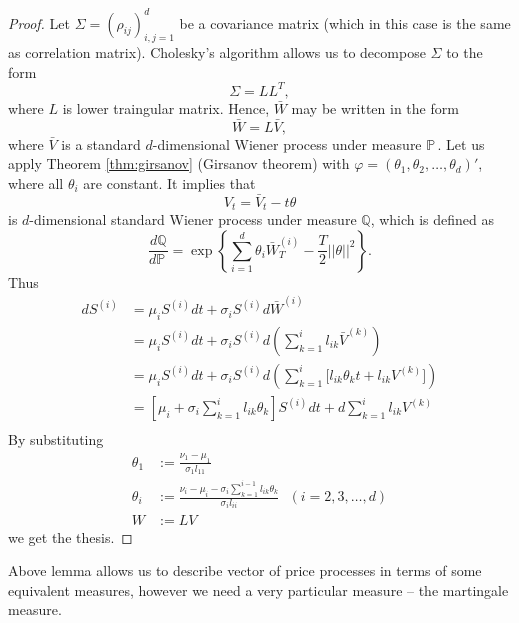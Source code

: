 \documentclass[a4paper,11pt, twoside]{book}
\theoremstyle{definition}
\theoremstyle{remark}
\def\P{{\mathbb{P}}\,}
\begin{document}
\begin{proof}
 Let $\Sigma = (\rho_{ij})_{i,j=1}^d$ be a covariance matrix (which in this case is the same as correlation matrix). Cholesky's algorithm allows us to decompose $\Sigma$ to the form
 \[ \Sigma = LL^T, \]
 where $L$ is lower traingular matrix. Hence, $\bar{W}$ may be written in the form
 \[ \bar{W} = L \bar{V}, \]
 where $\bar{V}$ is a standard $d$-dimensional Wiener process under measure $\P$. Let us apply Theorem \ref{thm:girsanov} (Girsanov theorem) with $\varphi = (\theta_1, \theta_2, \ldots, \theta_d)'$, where all $\theta_i$ are constant. It implies that
 \[ V_t = \bar{V}_t - t\theta \]
 is $d$-dimensional standard Wiener process under measure $\mathbb{Q}$, which is defined as
 \[\frac{d\mathbb{Q}}{d\P} = \exp\left\{ \sum\limits_{i=1}^d \theta_i \bar{W}^{(i)}_T - \frac{T}{2} ||\theta||^2 \right\}.\] Thus
 \begin{equation*}
  \begin{split}
   dS^{(i)} &= \mu_i S^{(i)} dt + \sigma_i S^{(i)} d\bar{W}^{(i)} \\
            &= \mu_i S^{(i)} dt + \sigma_i S^{(i)} d\left(\sum\limits_{k=1}^i l_{ik} \bar{V}^{(k)}\right) \\
            &= \mu_i S^{(i)} dt + \sigma_i S^{(i)} d\left(\sum\limits_{k=1}^i \bigl[ l_{ik}\theta_k t + l_{ik} V^{(k)} \bigr] \right) \\    
            &= \left[ \mu_i + \sigma_i \sum\limits_{k=1}^i l_{ik}\theta_k \right] S^{(i)}dt + d\sum\limits_{k=1}^i l_{ik} V^{(k)} \\      
  \end{split}
 \end{equation*}
 By substituting
 \begin{align*}
  \theta_1 &:= \frac{\nu_1 - \mu_1}{\sigma_1 l_{11}}\\
  \theta_i &:= \frac{\nu_i - \mu_i - \sigma_i \sum\limits_{k=1}^{i-1} l_{ik}\theta_k}{\sigma_il_{ii}}\ \ \ (i=2,3,\ldots,d)\\
         W &:= LV
 \end{align*}
 we get the thesis.
\end{proof}

Above lemma allows us to describe vector of price processes in terms of some equivalent measures, however we need a very particular measure -- the martingale measure.
\end{document}
